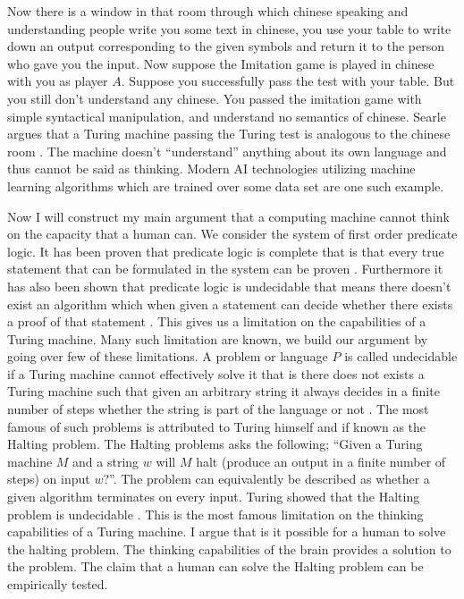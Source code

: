 \documentclass[11pt,a4paper]{article}
\begin{document}
Now there is a window in that room through which chinese speaking and understanding people write you some text in chinese, you use your table to write down an output corresponding to the given symbols and return it to the person who gave you the input. 
Now suppose the Imitation game is played in chinese with you as player $A$. Suppose you successfully pass the test with your table. But you still don't understand any chinese. You passed the imitation game with simple syntactical manipulation, and understand no semantics of chinese. 
Searle argues that a Turing machine passing the Turing test is analogous to the chinese room \cite{Searle}. The machine doesn't ``understand'' anything about its own language and thus cannot be said as thinking.
Modern AI technologies utilizing machine learning algorithms which are trained over some data set are one such example. 
\\\par\vspace*{0.5cm}
Now I will construct my main argument that a computing machine cannot think on the capacity that a human can. 
We consider the system of first order predicate logic. It has been proven that predicate logic is complete that is that every true statement that can be formulated in the system can be proven \cite{Anita}. Furthermore it has also been shown that predicate logic is undecidable that means there doesn't exist an algorithm which when given a statement can decide whether there exists a proof of that statement \cite{Lampert}.
This gives us a limitation on the capabilities of a Turing machine. Many such limitation are known, we build our argument by going over few of these limitations. 
A problem or language $P$ is called undecidable if a Turing machine cannot effectively solve it that is there does not exists a Turing machine such that given an arbitrary string it always decides in a finite number of steps whether the string is part of the language or not \cite{sipser13}.
The most famous of such problems is attributed to Turing himself and if known as the Halting problem.
The Halting problems asks the following; ``Given a Turing machine $M$ and a string $w$ will $M$ halt (produce an output in a finite number of steps) on input $w$?''. The problem can equivalently be described as whether a given algorithm terminates on every input.
Turing showed that the Halting problem is undecidable \cite{Turing36}\cite{sipser13}. This is the most famous limitation on the thinking capabilities of a Turing machine. I argue that is it possible for a human to solve the halting problem. The thinking capabilities of the brain provides a solution to the problem. The claim that a human can solve the Halting problem can be empirically tested. 
\end{document}

